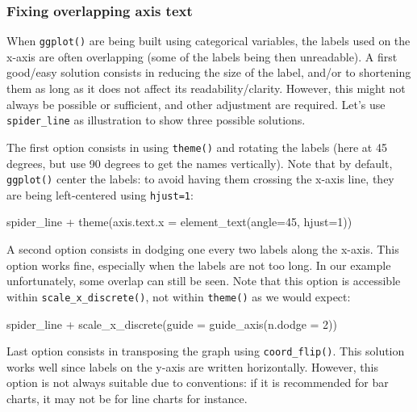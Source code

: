 \documentclass[
]{book}
\newenvironment{Shaded}{\begin{snugshade}}{\end{snugshade}}
\newcommand{\AttributeTok}[1]{\textcolor[rgb]{0.77,0.63,0.00}{#1}}
\newcommand{\DecValTok}[1]{\textcolor[rgb]{0.00,0.00,0.81}{#1}}
\newcommand{\FunctionTok}[1]{\textcolor[rgb]{0.00,0.00,0.00}{#1}}
\newcommand{\NormalTok}[1]{#1}
\newcommand{\SpecialCharTok}[1]{\textcolor[rgb]{0.00,0.00,0.00}{#1}}
\begin{document}
\hypertarget{fixing-overlapping-axis-text}{%
\subsubsection{Fixing overlapping axis text}\label{fixing-overlapping-axis-text}}

When \texttt{ggplot()} are being built using categorical variables, the labels used on the x-axis are often overlapping (some of the labels being then unreadable). A first good/easy solution consists in reducing the size of the label, and/or to shortening them as long as it does not affect its readability/clarity. However, this might not always be possible or sufficient, and other adjustment are required. Let's use \texttt{spider\_line} as illustration to show three possible solutions.

The first option consists in using \texttt{theme()} and rotating the labels (here at 45 degrees, but use 90 degrees to get the names vertically). Note that by default, \texttt{ggplot()} center the labels: to avoid having them crossing the x-axis line, they are being left-centered using \texttt{hjust=1}:

\begin{Shaded}
\begin{Highlighting}[]
\NormalTok{spider\_line }\SpecialCharTok{+} 
  \FunctionTok{theme}\NormalTok{(}\AttributeTok{axis.text.x =} \FunctionTok{element\_text}\NormalTok{(}\AttributeTok{angle=}\DecValTok{45}\NormalTok{, }\AttributeTok{hjust=}\DecValTok{1}\NormalTok{))}
\end{Highlighting}
\end{Shaded}

A second option consists in dodging one every two labels along the x-axis. This option works fine, especially when the labels are not too long. In our example unfortunately, some overlap can still be seen. Note that this option is accessible within \texttt{scale\_x\_discrete()}, not within \texttt{theme()} as we would expect:

\begin{Shaded}
\begin{Highlighting}[]
\NormalTok{spider\_line }\SpecialCharTok{+} 
  \FunctionTok{scale\_x\_discrete}\NormalTok{(}\AttributeTok{guide =} \FunctionTok{guide\_axis}\NormalTok{(}\AttributeTok{n.dodge =} \DecValTok{2}\NormalTok{))}
\end{Highlighting}
\end{Shaded}

Last option consists in transposing the graph using \texttt{coord\_flip()}. This solution works well since labels on the y-axis are written horizontally. However, this option is not always suitable due to conventions: if it is recommended for bar charts, it may not be for line charts for instance.
\end{document}

